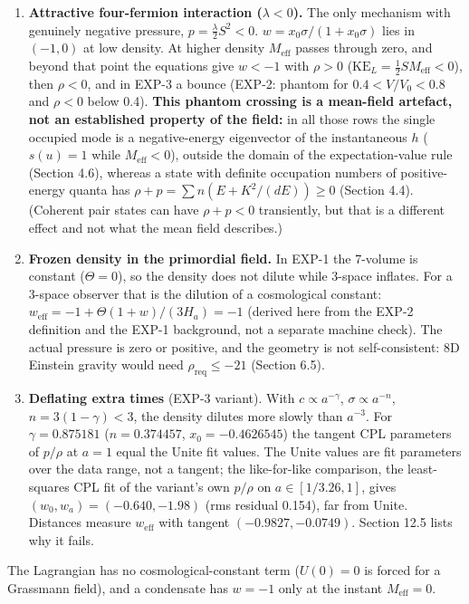 \documentclass[11pt]{article}
\begin{document}
\begin{enumerate}
\item \textbf{Attractive four-fermion interaction ($\lambda<0$).} The only mechanism with genuinely negative pressure, $p=\tfrac\lambda2S^2<0$. $w=x_0\sigma/(1+x_0\sigma)$ lies in $(-1,0)$ at low density. At higher density $M_{\mathrm{eff}}$ passes through zero, and beyond that point the equations give $w<-1$ with $\rho>0$ ($\mathrm{KE}_L=\tfrac12SM_{\mathrm{eff}}<0$), then $\rho<0$, and in EXP-3 a bounce (EXP-2: phantom for $0.4<V/V_0<0.8$ and $\rho<0$ below 0.4). \textbf{This phantom crossing is a mean-field artefact, not an established property of the field:} in all those rows the single occupied mode is a negative-energy eigenvector of the instantaneous $h$ ($s(u)=1$ while $M_{\mathrm{eff}}<0$), outside the domain of the expectation-value rule (Section 4.6), whereas a state with definite occupation numbers of positive-energy quanta has $\rho+p=\sum n(E+K^2/(dE))\ge0$ (Section 4.4). (Coherent pair states can have $\rho+p<0$ transiently, but that is a different effect and not what the mean field describes.)
\item \textbf{Frozen density in the primordial field.} In EXP-1 the 7-volume is constant ($\Theta=0$), so the density does not dilute while 3-space inflates. For a 3-space observer that is the dilution of a cosmological constant: $w_{\mathrm{eff}}=-1+\Theta(1+w)/(3H_a)=-1$ (derived here from the EXP-2 definition and the EXP-1 background, not a separate machine check). The actual pressure is zero or positive, and the geometry is not self-consistent: 8D Einstein gravity would need $\rho_{\mathrm{req}}\le-21$ (Section 6.5).
\item \textbf{Deflating extra times} (EXP-3 variant). With $c\propto a^{-\gamma}$, $\sigma\propto a^{-n}$, $n=3(1-\gamma)<3$, the density dilutes more slowly than $a^{-3}$. For $\gamma=0.875181$ ($n=0.374457$, $x_0=-0.4626545$) the tangent CPL parameters of $p/\rho$ at $a=1$ equal the Unite fit values. The Unite values are fit parameters over the data range, not a tangent; the like-for-like comparison, the least-squares CPL fit of the variant's own $p/\rho$ on $a\in[1/3.26,1]$, gives $(w_0,w_a)=(-0.640,-1.98)$ (rms residual 0.154), far from Unite. Distances measure $w_{\mathrm{eff}}$ with tangent $(-0.9827,-0.0749)$. Section 12.5 lists why it fails.
\end{enumerate}

The Lagrangian has no cosmological-constant term ($U(0)=0$ is forced for a Grassmann field), and a condensate has $w=-1$ only at the instant $M_{\mathrm{eff}}=0$.
\end{document}

